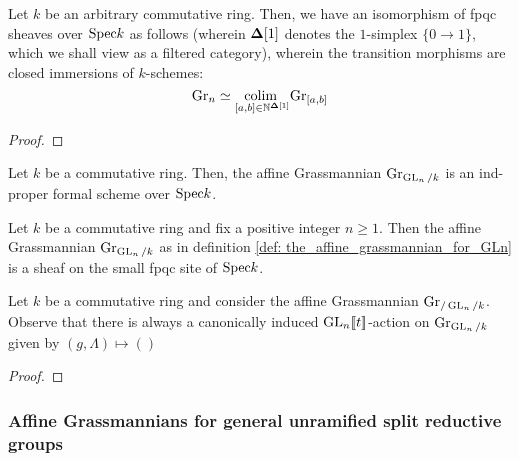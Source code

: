             \begin{proposition} \label{prop: the_colimit_over_truncated_grassmannians}
                Let $k$ be an arbitrary commutative ring. Then, we have an isomorphism of fpqc sheaves over $\mathrm{Spec} k$ as follows (wherein $\mathbf{\Delta}[1]$ denotes the $1$-simplex $\{0 \to 1\}$, which we shall view as a filtered category), wherein the transition morphisms are closed immersions of $k$-schemes:
                    $$\mathrm{Gr}_n \simeq \underset{ [a, b] \in \mathbb{N}^{\mathbf{\Delta}[1]} }{\operatorname{colim} \:} \mathrm{Gr}_{[a, b]}$$
            \end{proposition}
                \begin{proof}
                        
                \end{proof}
            \begin{corollary}
                Let $k$ be a commutative ring. Then, the affine Grassmannian $\mathrm{Gr}_{\operatorname{GL}_n/k}$ is an ind-proper formal scheme over $\mathrm{Spec} k$.
            \end{corollary}
            \begin{corollary} \label{lemma: the_affine_grassmannian_for_GLn_is_an_fpqc_sheaf}
                Let $k$ be a commutative ring and fix a positive integer $n \geq 1$. Then the affine Grassmannian $\mathrm{Gr}_{\operatorname{GL}_n/k}$ as in definition \ref{def: the_affine_grassmannian_for_GLn} is a sheaf on the small fpqc site of $\mathrm{Spec} k$.
            \end{corollary}
            \begin{remark} \label{remark: actions_of_loop_groups_on_affine_grassmannians}
                Let $k$ be a commutative ring and consider the affine Grassmannian $\mathrm{Gr}_{/\operatorname{GL}_n/k}$. Observe that there is always a canonically induced $\operatorname{GL}_n[\![t]\!]$-action on $\mathrm{Gr}_{\operatorname{GL}_n/k}$ given by $(g, \Lambda) \mapsto ()$
            \end{remark}
            \begin{proposition}[]
                
            \end{proposition}
                \begin{proof}
                        
                \end{proof}
                
        \subsubsection{Affine Grassmannians for general unramified split reductive groups}
        

